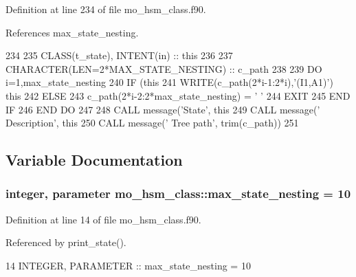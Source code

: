 Definition at line 234 of file mo\+\_\+hsm\+\_\+class.\+f90.



References max\+\_\+state\+\_\+nesting.


\begin{DoxyCode}
234 
235     \textcolor{keywordtype}{CLASS}(t\_state), \textcolor{keywordtype}{INTENT(in)} :: this
236 
237     \textcolor{keywordtype}{CHARACTER(LEN=2*MAX\_STATE\_NESTING)} :: c\_path
238 
239     \textcolor{keywordflow}{DO} i=1,max\_state\_nesting
240       \textcolor{keywordflow}{IF} (this%
241         \textcolor{keyword}{WRITE}(c\_path(2*i-1:2*i),\textcolor{stringliteral}{'(I1,A1)'}) this%
242       \textcolor{keywordflow}{ELSE}
243         c\_path(2*i-2:2*max\_state\_nesting) = \textcolor{stringliteral}{' '}
244         \textcolor{keywordflow}{EXIT}
245 \textcolor{keywordflow}{      END IF}
246 \textcolor{keywordflow}{    END DO}
247 
248     \textcolor{keyword}{CALL }message(\textcolor{stringliteral}{'State'}, this%
249     \textcolor{keyword}{CALL }message(\textcolor{stringliteral}{'  Description'}, this%
250     \textcolor{keyword}{CALL }message(\textcolor{stringliteral}{'  Tree path'}, trim(c\_path))
251 
\end{DoxyCode}


\subsection{Variable Documentation}
\hypertarget{namespacemo__hsm__class_a32995d2c8288f1be7f2ea26c26a24892}{}
\subsubsection[{max\+\_\+state\+\_\+nesting}]{\setlength{\rightskip}{0pt plus 5cm}integer, parameter mo\+\_\+hsm\+\_\+class\+::max\+\_\+state\+\_\+nesting = 10}\label{namespacemo__hsm__class_a32995d2c8288f1be7f2ea26c26a24892}


Definition at line 14 of file mo\+\_\+hsm\+\_\+class.\+f90.



Referenced by print\+\_\+state().


\begin{DoxyCode}
14   \textcolor{keywordtype}{INTEGER}, \textcolor{keywordtype}{PARAMETER} :: max\_state\_nesting = 10
\end{DoxyCode}
\hypertarget{namespacemo__hsm__class_a0c94990aceda682db1c3282ff2d8c836}{}
